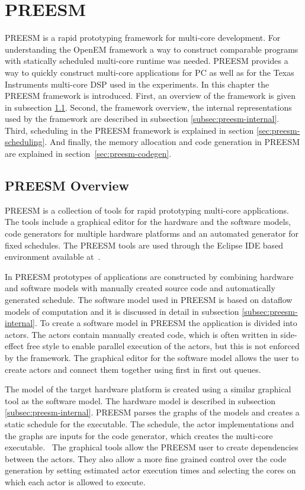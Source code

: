 \section{PREESM}
\label{sec:preesm}
PREESM is a rapid prototyping framework for multi-core development. For understanding the OpenEM framework a way to construct comparable programs with statically scheduled multi-core runtime was needed. PREESM provides a way to quickly construct multi-core applications for PC as well as for the Texas Instruments multi-core DSP used in the experiments. In this chapter the PREESM framework is introduced. First, an overview of the framework is given in subsection \ref{subsec:preesm-overview}. Second, the framework overview, the internal representations used by the framework are described in subsection \ref{subsec:preesm-internal}. Third, scheduling in the PREESM framework is explained in section \ref{sec:preesm-scheduling}. And finally, the memory allocation and code generation in PREESM are explained in section~\ref{sec:preesm-codegen}.

\subsection{PREESM Overview}
\label{subsec:preesm-overview}
PREESM is a collection of tools for rapid prototyping multi-core applications. The tools include a graphical editor for the hardware and the software models, code generators for multiple hardware platforms and an automated generator for fixed schedules. The PREESM tools are used through the Eclipse IDE based environment available at~\cite{preesm}.

In PREESM prototypes of applications are constructed by combining hardware and software models with manually created source code and automatically generated schedule. The software model used in PREESM is based on dataflow models of computation and it is discussed in detail in subsection \ref{subsec:preesm-internal}. To create a software model in PREESM the application is divided into actors. The actors contain manually created code, which is often written in side-effect free style to enable parallel execution of the actors, but this is not enforced by the framework. The graphical editor for the software model allows the user to create actors and connect them together using first in first out queues.~\cite{preesm}

The model of the target hardware platform is created using a similar graphical tool as the software model. The hardware model is described in subsection \ref{subsec:preesm-internal}. PREESM parses the graphs of the models and creates a static schedule for the executable. The schedule, the actor implementations and the graphs are inputs for the code generator, which creates the multi-core executable.~\cite{pelcat2014preesm} The graphical tools allow the PREESM user to create dependencies between the actors. They also allow a more fine grained control over the code generation by setting estimated actor execution times and selecting the cores on which each actor is allowed to execute.

